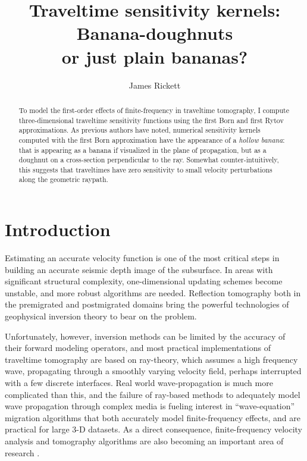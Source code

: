 \def\figdir{./Fig} 

\title{Traveltime sensitivity kernels: Banana-doughnuts \\ or just
plain bananas?}

\author{James Rickett}

\begin{abstract}
To model the first-order effects of finite-frequency in
traveltime tomography, I compute three-dimensional traveltime
sensitivity functions using the first Born and first Rytov
approximations. 
As previous authors have noted, numerical sensitivity kernels computed
with the first Born approximation have the appearance of a {\em hollow
banana}: that is appearing as a banana if visualized in the plane of
propagation, but as a doughnut on a cross-section perpendicular to the
ray.  Somewhat counter-intuitively, this suggests that traveltimes
have zero sensitivity to small velocity perturbations along the
geometric raypath.  
\end{abstract}

\section{Introduction}
Estimating an accurate velocity function is one of the most critical
steps in building an accurate seismic depth image of the subsurface.
In areas with significant structural complexity, one-dimensional
updating schemes become unstable, and more robust algorithms are
needed.
Reflection tomography both in the premigrated \cite[]{bishop85} and
postmigrated domains \cite[]{stork92,kosloff96} bring the powerful
technologies of geophysical inversion theory
to bear on the problem. 

\par
Unfortunately, however, inversion methods can be limited by the
accuracy of their forward modeling operators, and most practical 
implementations of traveltime tomography are based on ray-theory,
which assumes a high frequency wave, propagating through a smoothly
varying velocity field, perhaps interrupted with a few discrete
interfaces. 
Real world wave-propagation is much more complicated than this, and 
the failure of ray-based methods to adequately model wave propagation
through complex media is fueling interest in ``wave-equation''
migration algorithms that both accurately model finite-frequency
effects, and are practical for large 3-D datasets.
As a direct consequence, finite-frequency velocity analysis and
tomography algorithms are also becoming an important area of research 
\cite[]{woodward92,biondi.segab99}.

